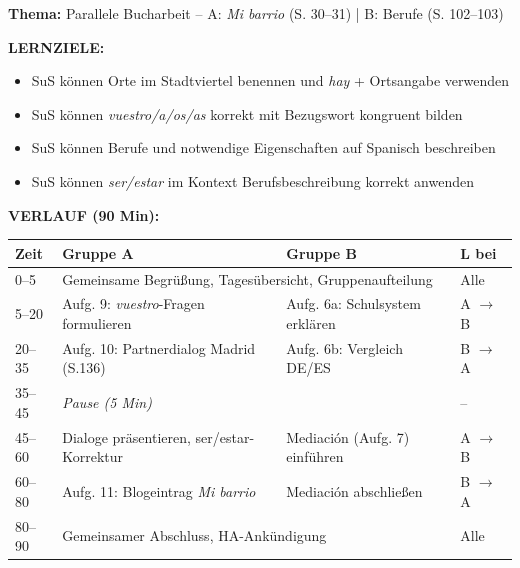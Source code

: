 \documentclass[11pt, a4paper]{article}
\newcommand{\es}[1]{\textcolor{spanisch}{\textit{#1}}}
\begin{document}
\begin{dsbox}[title={DS 1 -- Bucharbeit parallel (Mo, 05.01.2026)}]

\textbf{Thema:} Parallele Bucharbeit -- A: \es{Mi barrio} (S. 30--31) | B: Berufe (S. 102--103)

\vspace{0.3cm}

\textbf{LERNZIELE:}
\begin{itemize}[leftmargin=1.5em, nosep]
    \item[\textcolor{gruppeA}{A:}] SuS können Orte im Stadtviertel benennen und \es{hay} + Ortsangabe verwenden
    \item[\textcolor{gruppeA}{A:}] SuS können \es{vuestro/a/os/as} korrekt mit Bezugswort kongruent bilden
    \item[\textcolor{gruppeB}{B:}] SuS können Berufe und notwendige Eigenschaften auf Spanisch beschreiben
    \item[\textcolor{gruppeB}{B:}] SuS können \es{ser/estar} im Kontext Berufsbeschreibung korrekt anwenden
\end{itemize}

\vspace{0.2cm}

\textbf{VERLAUF (90 Min):}

\begin{tabular}{|p{1.2cm}|p{5.5cm}|p{5.5cm}|p{1.5cm}|}
\hline
\rowcolor{hellgrau}
\textbf{Zeit} & \textbf{Gruppe A} & \textbf{Gruppe B} & \textbf{L bei} \\
\hline
0--5 & \multicolumn{2}{l|}{Gemeinsame Begrüßung, Tagesübersicht, Gruppenaufteilung} & Alle \\
\hline
5--20 & Aufg. 9: \es{vuestro}-Fragen formulieren & Aufg. 6a: Schulsystem erklären & A $\rightarrow$ B \\
\hline
20--35 & Aufg. 10: Partnerdialog Madrid (S.136) & Aufg. 6b: Vergleich DE/ES & B $\rightarrow$ A \\
\hline
35--45 & \multicolumn{2}{l|}{\textit{Pause (5 Min)}} & -- \\
\hline
45--60 & Dialoge präsentieren, ser/estar-Korrektur & Mediación (Aufg. 7) einführen & A $\rightarrow$ B \\
\hline
60--80 & Aufg. 11: Blogeintrag \es{Mi barrio} & Mediación abschließen & B $\rightarrow$ A \\
\hline
80--90 & \multicolumn{2}{l|}{Gemeinsamer Abschluss, HA-Ankündigung} & Alle \\
\hline
\end{tabular}


\end{dsbox}
\end{document}
